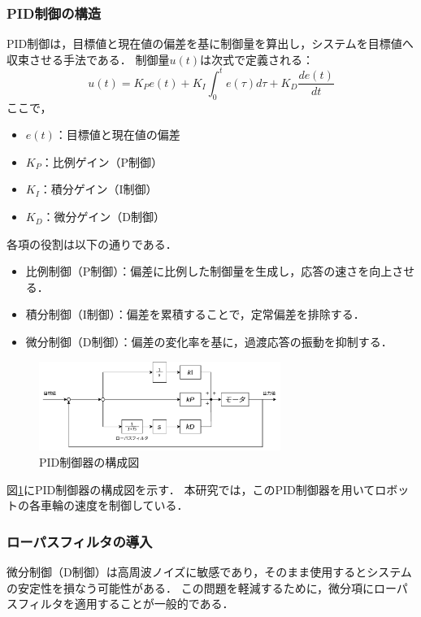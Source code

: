 \subsubsection{PID制御の構造}
PID制御は，目標値と現在値の偏差を基に制御量を算出し，システムを目標値へ収束させる手法である．
制御量$u(t)$は次式で定義される：
\begin{equation}
    u(t) = K_P e(t) + K_I \int_{0}^{t} e(\tau) d\tau + K_D \frac{de(t)}{dt}
    \label{eq:pid}
\end{equation}
ここで，
\begin{itemize}
    \item $e(t)$：目標値と現在値の偏差
    \item $K_P$：比例ゲイン（P制御）
    \item $K_I$：積分ゲイン（I制御）
    \item $K_D$：微分ゲイン（D制御）
\end{itemize}
各項の役割は以下の通りである．
\begin{itemize}
    \item 比例制御（P制御）：偏差に比例した制御量を生成し，応答の速さを向上させる．
    \item 積分制御（I制御）：偏差を累積することで，定常偏差を排除する．
    \item 微分制御（D制御）：偏差の変化率を基に，過渡応答の振動を抑制する．
\end{itemize}

\begin{figure}[h]
    \centering
    \includegraphics[width=0.7\textwidth]{figure/pid.pdf}
    \caption{PID制御器の構成図}
    \label{fig:pid_controller}
\end{figure}

図\ref{fig:pid_controller}にPID制御器の構成図を示す．
本研究では，このPID制御器を用いてロボットの各車輪の速度を制御している．

\subsubsection{ローパスフィルタの導入}
微分制御（D制御）は高周波ノイズに敏感であり，そのまま使用するとシステムの安定性を損なう可能性がある．
この問題を軽減するために，微分項にローパスフィルタを適用することが一般的である．

